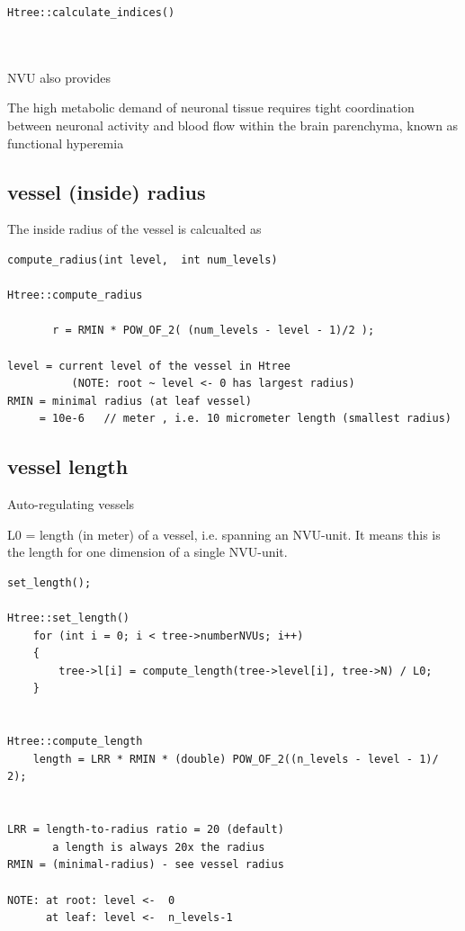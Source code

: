 \begin{verbatim}
Htree::calculate_indices()
  


\end{verbatim}

NVU also provides 


The high metabolic demand of neuronal tissue requires tight coordination between
neuronal activity and blood flow within the brain parenchyma, known as functional hyperemia

\subsection{vessel (inside) radius}
\label{sec:vessel-radius}

The inside radius of the vessel is calcualted as
\begin{verbatim}
compute_radius(int level,  int num_levels)

Htree::compute_radius
       
       r = RMIN * POW_OF_2( (num_levels - level - 1)/2 );
       
level = current level of the vessel in Htree 
          (NOTE: root ~ level <- 0 has largest radius)
RMIN = minimal radius (at leaf vessel)
     = 10e-6   // meter , i.e. 10 micrometer length (smallest radius)
\end{verbatim}

\subsection{vessel length}
\label{sec:vessel-length}

Auto-regulating vessels

L0 = length (in meter) of a vessel, i.e. spanning an NVU-unit. It means this is the length for one dimension
of a single NVU-unit.

\begin{verbatim}
set_length();

Htree::set_length()
    for (int i = 0; i < tree->numberNVUs; i++)
    {
        tree->l[i] = compute_length(tree->level[i], tree->N) / L0;
    }


Htree::compute_length
    length = LRR * RMIN * (double) POW_OF_2((n_levels - level - 1)/ 2);


LRR = length-to-radius ratio = 20 (default)
       a length is always 20x the radius
RMIN = (minimal-radius) - see vessel radius

NOTE: at root: level <-  0
      at leaf: level <-  n_levels-1
\end{verbatim}


